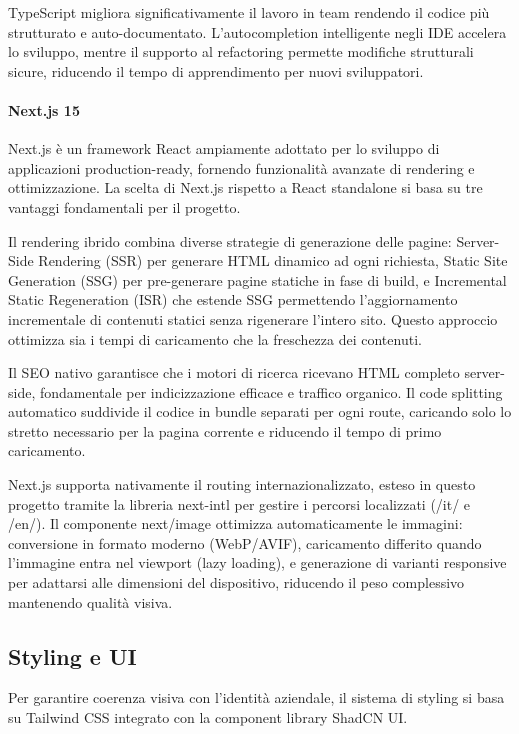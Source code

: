 TypeScript migliora significativamente il lavoro in team rendendo il codice più 
strutturato e auto-documentato. L'autocompletion intelligente negli IDE accelera 
lo sviluppo, mentre il supporto al refactoring permette modifiche strutturali 
sicure, riducendo il tempo di apprendimento per nuovi sviluppatori.

\paragraph{Next.js 15}
Next.js è un framework React ampiamente adottato per lo sviluppo di applicazioni 
production-ready, fornendo funzionalità avanzate di rendering e ottimizzazione. 
La scelta di Next.js rispetto a React standalone si basa su tre vantaggi 
fondamentali per il progetto.

Il rendering ibrido combina diverse strategie di generazione delle pagine: 
Server-Side Rendering (SSR) per generare HTML dinamico ad ogni richiesta, 
Static Site Generation (SSG) per pre-generare pagine statiche in fase di build, 
e Incremental Static Regeneration (ISR) che estende SSG permettendo 
l'aggiornamento incrementale di contenuti statici senza rigenerare l'intero 
sito. Questo approccio ottimizza sia i tempi di caricamento che la freschezza 
dei contenuti.

Il SEO nativo garantisce che i motori di ricerca ricevano HTML completo 
server-side, fondamentale per indicizzazione efficace e traffico organico. 
Il code splitting automatico suddivide il codice in bundle separati per 
ogni route, caricando solo lo stretto necessario per la pagina corrente 
e riducendo il tempo di primo caricamento.

Next.js supporta nativamente il routing internazionalizzato, esteso in questo 
progetto tramite la libreria next-intl per gestire i percorsi localizzati 
(/it/ e /en/). Il componente next/image ottimizza automaticamente le immagini: 
conversione in formato moderno (WebP/AVIF), caricamento differito quando 
l'immagine entra nel viewport (lazy loading), e generazione di varianti 
responsive per adattarsi alle dimensioni del dispositivo, riducendo il peso 
complessivo mantenendo qualità visiva.

\subsection{Styling e UI}

Per garantire coerenza visiva con l'identità aziendale, il sistema di styling 
si basa su Tailwind CSS integrato con la component library ShadCN UI.

